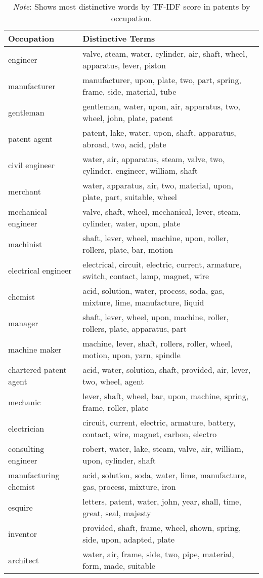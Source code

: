 \begin{table}[H]
\centering
\caption{Most Distinctive Words by Occupation}
\begin{tabular}{|l|p{12cm}|}
\hline
\textbf{Occupation} & \textbf{Distinctive Terms} \\
\hline
engineer & valve, steam, water, cylinder, air, shaft, wheel, apparatus, lever, piston \\
\hline
manufacturer & manufacturer, upon, plate, two, part, spring, frame, side, material, tube \\
\hline
gentleman & gentleman, water, upon, air, apparatus, two, wheel, john, plate, patent \\
\hline
patent agent & patent, lake, water, upon, shaft, apparatus, abroad, two, acid, plate \\
\hline
civil engineer & water, air, apparatus, steam, valve, two, cylinder, engineer, william, shaft \\
\hline
merchant & water, apparatus, air, two, material, upon, plate, part, suitable, wheel \\
\hline
mechanical engineer & valve, shaft, wheel, mechanical, lever, steam, cylinder, water, upon, plate \\
\hline
machinist & shaft, lever, wheel, machine, upon, roller, rollers, plate, bar, motion \\
\hline
electrical engineer & electrical, circuit, electric, current, armature, switch, contact, lamp, magnet, wire \\
\hline
chemist & acid, solution, water, process, soda, gas, mixture, lime, manufacture, liquid \\
\hline
manager & shaft, lever, wheel, upon, machine, roller, rollers, plate, apparatus, part \\
\hline
machine maker & machine, lever, shaft, rollers, roller, wheel, motion, upon, yarn, spindle \\
\hline
chartered patent agent & acid, water, solution, shaft, provided, air, lever, two, wheel, agent \\
\hline
mechanic & lever, shaft, wheel, bar, upon, machine, spring, frame, roller, plate \\
\hline
electrician & circuit, current, electric, armature, battery, contact, wire, magnet, carbon, electro \\
\hline
consulting engineer & robert, water, lake, steam, valve, air, william, upon, cylinder, shaft \\
\hline
manufacturing chemist & acid, solution, soda, water, lime, manufacture, gas, process, mixture, iron \\
\hline
esquire & letters, patent, water, john, year, shall, time, great, seal, majesty \\
\hline
inventor & provided, shaft, frame, wheel, shown, spring, side, upon, adapted, plate \\
\hline
architect & water, air, frame, side, two, pipe, material, form, made, suitable \\
\hline
\end{tabular}
\caption*{\textit{Note}: Shows most distinctive words by TF-IDF score in patents by occupation.}
\label{table:distinctive_terms}
\end{table}